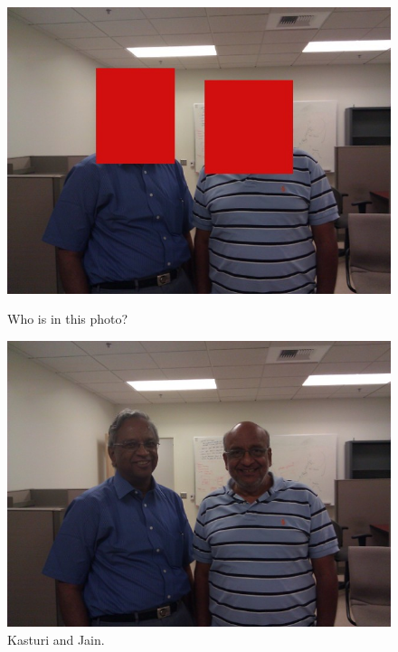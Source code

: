 \begin{figure}[ht]
\begin{minipage}[b]{0.45\linewidth}
\centering
\includegraphics[width=\textwidth]{media/chapter1/kasturi-hidden.jpg}
\caption{Who is in this photo?}
\label{fig:example-kasturi-hidden}
\end{minipage}
\hspace{0.5cm}
\begin{minipage}[b]{0.45\linewidth}
\centering
\includegraphics[width=\textwidth]{media/chapter1/kasturi-show.jpg}
\caption{Kasturi and Jain.}
\label{fig:example-kasturi-show}
\end{minipage}
\end{figure}

